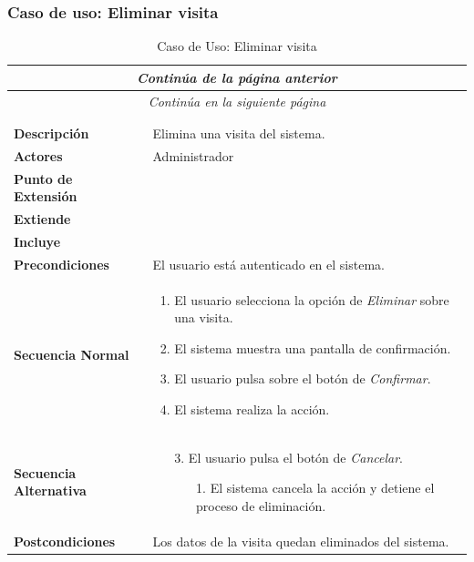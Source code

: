 \subsubsection*{Caso de uso: Eliminar visita }
\begin{longtable}{| p{4cm} | p{10cm} |}
\endfirsthead
\multicolumn{2}{c}{\textit{Continúa de la página anterior}}\\[12pt]
\hline
\endhead
\hline
\multicolumn{2}{c}{\textit{Continúa en la siguiente página}} \\
\endfoot
\hline
\caption{Caso de Uso: Eliminar visita}\label{fig:1}\\
\endlastfoot


\hline
\multicolumn{2}{|c|}{\textbf{CU$<$34$>$ - Eliminar Visita}} \\

\hline
\textbf{Descripción} &
Elimina una visita del sistema.\\

\hline
\textbf{Actores} &
Administrador\\

\hline
\textbf{Punto de Extensión} &
\\

\hline
\textbf{Extiende} &
\\

\hline
\textbf{Incluye} &
\\

\hline
\textbf{Precondiciones} &
El usuario está autenticado en el sistema.\\

\hline
\textbf{Secuencia Normal} &\mbox{}\par\vspace{-\baselineskip}
\begin{enumerate}[leftmargin=0.7cm, topsep=0.1cm]
\item El usuario selecciona la opción de \textit{Eliminar} sobre una visita.
\item El sistema muestra una pantalla de confirmación.
\item El usuario pulsa sobre el botón de \textit{Confirmar}.
\item El sistema realiza la acción.
\end{enumerate}


\\
\hline
\textbf{Secuencia Alternativa} &\mbox{}\par\vspace{-\baselineskip}
\begin{enumerate}[leftmargin=0.9cm, topsep=0.1cm]
\item[3.] El usuario pulsa el botón de \textit{Cancelar}.
	\begin{itemize}
	\item[1.] El sistema cancela la acción y detiene el proceso de eliminación.
	\end{itemize}
\end{enumerate}
\\

\hline
\textbf{Postcondiciones} & 
Los datos de la visita quedan eliminados del sistema.\\
\hline
\end{longtable}



